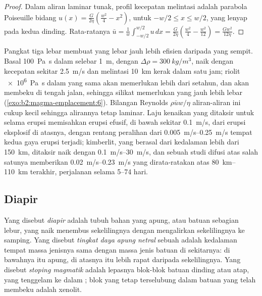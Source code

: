 \begin{proof}
Dalam aliran laminar tunak, profil kecepatan melintasi  adalah parabola
Poiseuille bidang $u(x) = \frac{G}{2\eta}\left(\frac{w^2}{4} - x^2\right)$, untuk
$-w/2 \le x \le w/2$, yang lenyap pada kedua dinding. Rata-ratanya
$\bar u = \frac1w\int_{-w/2}^{w/2}u\,dx = \frac{G}{2\eta}\left(\frac{w^2}{4} -
\frac{w^2}{12}\right) = \frac{Gw^2}{12\eta}$.
\end{proof}

Pangkat tiga lebar membuat  yang lebar jauh lebih efisien daripada yang sempit.
Basal \qty{100}{Pa.s} dalam  selebar \qty{1}{m}, dengan $\Delta\rho =
\qty{300}{kg/m^3}$, naik dengan kecepatan sekitar \qty{2.5}{m/s} dan melintasi \qty{10}{km}
kerak dalam satu jam; riolit \qty{e6}{Pa.s} dalam  yang sama akan memerlukan lebih
dari setahun, dan akan membeku di tengah jalan, sehingga  silikat memerlukan  yang jauh lebih
lebar (\cref{exo:b2:magma-emplacement:6}). Bilangan Reynolds $\rho\bar u w/\eta$ aliran-aliran ini
cukup kecil sehingga alirannya tetap laminar. Laju kenaikan yang ditaksir untuk 
selama erupsi memisahkan erupsi efusif, di bawah sekitar \qty{0.1}{m/s}, dari
erupsi eksplosif di atasnya, dengan rentang peralihan dari \qtyrange{0.005}{0.25}{m/s}
tempat kedua gaya erupsi terjadi; kimberlit, yang berasal dari
kedalaman lebih dari \qty{150}{km}, ditaksir naik dengan \qtyrange{0.1}{30}{m/s}, dan
sebuah studi difusi atas salah satunya memberikan \qtyrange{0.02}{0.23}{m/s} yang dirata-ratakan atas
\qtyrange{80}{110}{km} terakhir, perjalanan selama \numrange{5}{74} hari.

\subsection{Diapir}

\begin{definition}\label{def:b2:magma-emplacement:ascent}
Yang disebut \emph{diapir} adalah tubuh bahan yang apung,  atau batuan
sebagian lebur, yang naik menembus sekelilingnya dengan mengalirkan sekelilingnya ke samping. Yang disebut
\emph{tingkat daya apung netral} sebuah  adalah
kedalaman tempat massa jenisnya sama dengan massa jenis batuan di sekitarnya: di bawahnya
 itu apung, di atasnya  itu lebih rapat daripada sekelilingnya. Yang disebut \emph{stoping
magmatik} adalah lepasnya blok-blok batuan dinding atau atap,
yang tenggelam ke dalam ; blok yang tetap terselubung dalam batuan yang telah membeku
adalah xenolit.
\end{definition}


